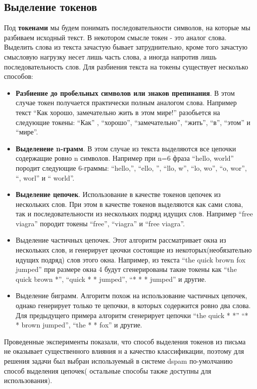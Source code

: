 \subsection{Выделение токенов}
Под \textbf{токенами} мы будем понимать последовательности символов, на которые мы разбиваем исходный текст. В некотором смысле токен - это аналог слова. Выделить слова из текста зачастую бывает затруднительно, кроме того зачастую смысловую нагрузку несет лишь часть слова, а иногда напротив лишь последовательность слов. Для разбиения текста на токены существует несколько способов:
\begin{itemize}
\item \textbf{Разбиение до пробельных символов или знаков препинания}. В этом случае токен получается практически полным аналогом слова. Например текст ``Как хорошо, замечательно жить в этом мире!'' разобьется на следующие токены:
 ``Как'' , ``хорошо'', ``замечательно'', ``жить'', ``в'', ``этом'' и ``мире''.

 \item \textbf{Выделенеие n-грамм}. В этом случае из текста выделяются все цепочки содержащие ровно n символов. Например при n=6 фраза ``hello, world'' породит следующие 6-граммы: ``hello,'', ``ello, '', ``llo, w'', ``lo, wo'', ``o, wor'', ``, worl'' и `` world''.

 \item \textbf{Выделение цепочек}. Использование в качестве токенов цепочек из нескольких слов. При этом в качестве токенов выделяются как сами слова, так и последовательности из нескольких подряд идущих слов. Например ``free viagra'' породит токены ``free'', ``viagra'' и ``free viagra''.
\item {Выделение частичных цепочек}. Этот алгоритм рассматривает окна из нескольких слов, и генерирует цеочки состоящие из некоторых(необязательно идущих подряд) слов этого окна. Например, из  текста ``the quick brown fox jumped'' при размере окна 4 будут сгенерированы такие токены как ``the quick brown *'', ``quick * * jumped'', ``* * * jumped'' и другие.

\item {Выделение биграмм}. Алгоритм похож на использование частичных цепочек, однако генерирует только те цепочки, в которых содержится ровно два слова. Для предыдущего примера алгоритм сгенерирует цепочки ``the quick * *'' ``* * brown jumped'', ``the * * fox''  и другие.
\end{itemize}

Проведенные эксперименты показали, что способ выделения токенов из письма не оказывает существенного влияния н а качество классификации, поэтому для решения задачи был выбран используемый в системе dspam по-умолчанию способ выделения цепочек( остальные способы также доступны для использования).

